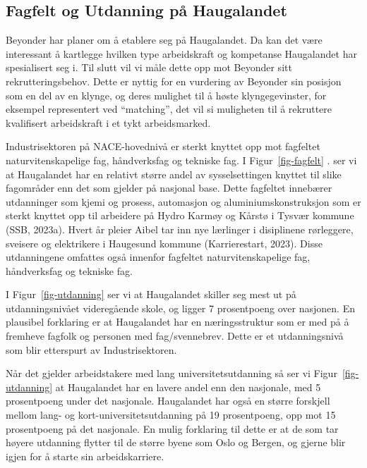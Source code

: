 \documentclass[
]{article}
\begin{document}
\hypertarget{fagfelt-og-utdanning-puxe5-haugalandet}{%
\subsection{Fagfelt og Utdanning på
Haugalandet}\label{fagfelt-og-utdanning-puxe5-haugalandet}}

Beyonder har planer om å etablere seg på Haugalandet. Da kan det være
interessant å kartlegge hvilken type arbeidskraft og kompetanse
Haugalandet har spesialisert seg i. Til slutt vil vi måle dette opp mot
Beyonder sitt rekrutteringsbehov. Dette er nyttig for en vurdering av
Beyonder sin posisjon som en del av en klynge, og deres mulighet til å
høste klyngegevinster, for eksempel representert ved ``matching'', det
vil si muligheten til å rekruttere kvalifisert arbeidskraft i et tykt
arbeidsmarked.

Industrisektoren på NACE-hovednivå er sterkt knyttet opp mot fagfeltet
naturvitenskapelige fag, håndverksfag og tekniske fag. I
Figur~\ref{fig-fagfelt} . ser vi at Haugalandet har en relativt større
andel av sysselsettingen knyttet til slike fagområder enn det som
gjelder på nasjonal base. Dette fagfeltet innebærer utdanninger som
kjemi og prosess, automasjon og aluminiumskonstruksjon som er sterkt
knyttet opp til arbeidere på Hydro Karmøy og Kårstø i Tysvær kommune
(SSB, 2023a). Hvert år pleier Aibel tar inn nye lærlinger i disiplinene
rørleggere, sveisere og elektrikere i Haugesund kommune (Karrierestart,
2023). Disse utdanningene omfattes også innenfor fagfeltet
naturvitenskapelige fag, håndverksfag og tekniske fag.

I Figur~\ref{fig-utdanning} ser vi at Haugalandet skiller seg mest ut på
utdanningsnivået videregående skole, og ligger 7 prosentpoeng over
nasjonen. En plausibel forklaring er at Haugalandet har en
næringsstruktur som er med på å fremheve fagfolk og personen med
fag/svennebrev. Dette er et utdanningsnivå som blir etterspurt av
Industrisektoren.

Når det gjelder arbeidstakere med lang universitetsutdanning så ser vi
Figur~\ref{fig-utdanning} at Haugalandet har en lavere andel enn den
nasjonale, med 5 prosentpoeng under det nasjonale. Haugalandet har også
en større forskjell mellom lang- og kort-universitetsutdanning på 19
prosentpoeng, opp mot 15 prosentpoeng på det nasjonale. En mulig
forklaring til dette er at de som tar høyere utdanning flytter til de
større byene som Oslo og Bergen, og gjerne blir igjen for å starte sin
arbeidskarriere.
\end{document}
